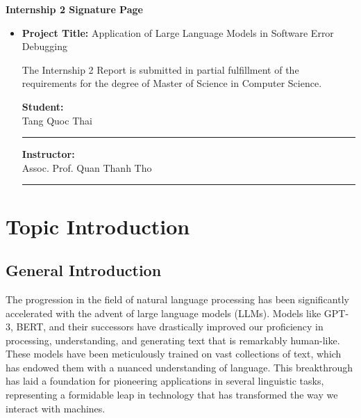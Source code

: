 \documentclass[a4paper,oneside]{book}
\begin{document}
\newpage
\begin{titlepage}
\thispagestyle{empty}
\begin{center}
    \begin{large}
        \textbf{Internship 2 Signature Page}
    \end{large}
\end{center}
\vspace{1.2cm}
\begin{itemize}
    \item[] \textbf{Project Title:} Application of Large Language Models in Software Error Debugging
    \vspace{1cm}

    The Internship 2 Report is submitted in partial fulfillment of the requirements for the degree of Master of Science in Computer Science.
    \vspace{2cm}

    \begin{minipage}{0.5\textwidth}
        \textbf{Student:} \\[2cm]
        Tang Quoc Thai\\[0.25cm]
        \hrulefill
        \rule{7cm}{0.4pt}
    \end{minipage}
    \begin{minipage}{0.5\textwidth}
        \begin{flushright}
            \textbf{Instructor:} \\[2cm]
            Assoc. Prof. Quan Thanh Tho\\[0.25cm]
            \hrulefill
            \rule{7cm}{0.4pt}
        \end{flushright}
    \end{minipage}
    \vspace{1cm}
\end{itemize}
\end{titlepage}

\newpage
\tableofcontents

\newpage
\listoffigures

\newpage
\listoftables

\newpage
\chapter{Topic Introduction}
\section{General Introduction}
The progression in the field of natural language processing has been significantly accelerated with the advent of large language models (LLMs). Models like GPT-3, BERT, and their successors have drastically improved our proficiency in processing, understanding, and generating text that is remarkably human-like. These models have been meticulously trained on vast collections of text, which has endowed them with a nuanced understanding of language. This breakthrough has laid a foundation for pioneering applications in several linguistic tasks, representing a formidable leap in technology that has transformed the way we interact with machines.
\end{document}
